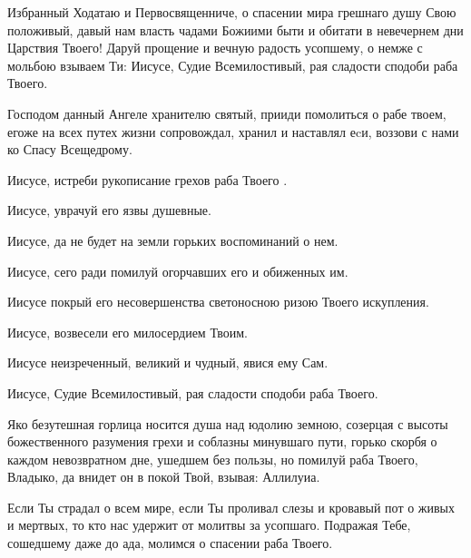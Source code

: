 \mychapterending



{\centering {}\par} 

\begin{mymulticols}

\newcommand{\akafistZaEdinKondakOne}{%
\mysubtitle{Кондак 1}

Избранный Ходатаю и Первосвященниче, о спасении мира грешнаго душу Свою положивый, давый нам власть чадами Божиими быти и обитати в невечернем дни Царствия Твоего! Даруй прощение и вечную радость усопшему, о немже с мольбою взываем Ти: Иисусе, Судие Всемилостивый, рая сладости сподоби раба Твоего.
}

\newcommand{\akafistZaEdinIkosOne}{%
\mysubtitle{Икос 1}

Господом данный Ангеле хранителю святый, прииди помолиться о рабе твоем, егоже на всех путех жизни сопровождал, хранил и наставлял еcи, воззови с нами ко Спасу Всещедрому. 

Иисусе, истреби рукописание грехов раба Твоего \myemph{(имярек)}. 

Иисусе, уврачуй его язвы душевные. 

Иисусе, да не будет на земли горьких воспоминаний о нем. 

Иисусе, сего ради помилуй огорчавших его и обиженных им. 

Иисусе покрый его несовершенства светоносною ризою Твоего искупления. 

Иисусе, возвесели его милосердием Твоим. 

Иисусе неизреченный, великий и чудный, явися ему Сам. 

Иисусе, Судие Всемилостивый, рая сладости сподоби раба Твоего.
}

\akafistZaEdinKondakOne

\akafistZaEdinIkosOne


Яко безутешная горлица носится душа над юдолию земною, созерцая с высоты божественного разумения грехи и соблазны минувшаго пути, горько скорбя о каждом невозвратном дне, ушедшем без пользы, но помилуй раба Твоего, Владыко, да внидет он в покой Твой, взывая: Аллилуиа.


Если Ты страдал о всем мире, если Ты проливал слезы и кровавый пот о живых и мертвых, то кто нас удержит от молитвы за усопшаго. Подражая Тебе, сошедшему даже до ада, молимся о спасении раба Твоего. 


\end{mymulticols}
